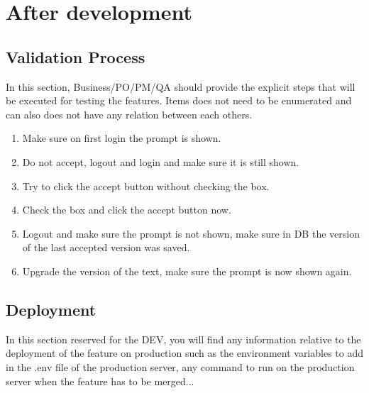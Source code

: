 \documentclass[a4paper,article,oneside]{memoir}
\begin{document}
      \chapter{After development}
        \section{Validation Process}
        In this section, \gls{Business}/\gls{PO}/\gls{PM}/\gls{QA} should provide the explicit steps that will be executed for testing the features. Items does not need to be enumerated and can also does not have any relation between each others.
        
\noindent{}

                \begin{enumerate}
  			\item Make sure on first login the prompt is shown.
  			\item Do not accept, logout and login and make sure it is still shown.
  			\item Try to click the accept button without checking the box.
  			 \item Check the box and click the accept button now.
  			 \item Logout and make sure the prompt is not shown, make sure in DB the version of the last accepted version was saved.
  			 \item Upgrade the version of the text, make sure the prompt is now shown again.
		\end{enumerate}
        \section{Deployment}
        In this section reserved for the \gls{DEV}, you will find any information relative to the deployment of the feature on production such as the environment variables to add in the .env file of the production server, any command to run on the production server when the feature has to be merged... 

\printglossary[nonumberlist]
\end{document}
